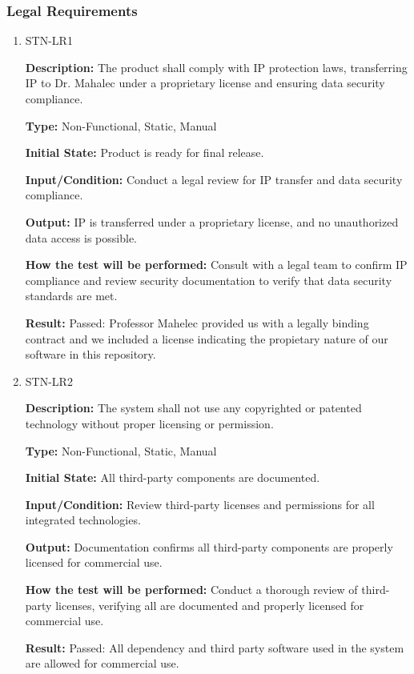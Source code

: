 \documentclass[12pt, titlepage]{article}
\begin{document}
\subsubsection{Legal Requirements}

\begin{enumerate}

\item{STN-LR1\\}

\textbf{Description:} The product shall comply with IP protection laws, transferring IP to Dr. Mahalec under a proprietary license and ensuring data security compliance.

\textbf{Type:} Non-Functional, Static, Manual

\textbf{Initial State:} Product is ready for final release.

\textbf{Input/Condition:} Conduct a legal review for IP transfer and data security compliance.

\textbf{Output:} IP is transferred under a proprietary license, and no unauthorized data access is possible.

\textbf{How the test will be performed:} Consult with a legal team to confirm IP compliance and review security documentation to verify that data security standards are met.

\textbf{Result:} Passed: Professor Mahelec provided us with a legally binding contract and we included a license indicating the propietary nature of our software in this repository. 

\item{STN-LR2\\}

\textbf{Description:} The system shall not use any copyrighted or patented technology without proper licensing or permission.

\textbf{Type:} Non-Functional, Static, Manual

\textbf{Initial State:} All third-party components are documented.

\textbf{Input/Condition:} Review third-party licenses and permissions for all integrated technologies.

\textbf{Output:} Documentation confirms all third-party components are properly licensed for commercial use.

\textbf{How the test will be performed:} Conduct a thorough review of third-party licenses, verifying all are documented and properly licensed for commercial use.

\textbf{Result:} Passed: All dependency and third party software used in the system are allowed for commercial use. 

\end{enumerate}
\end{document}
